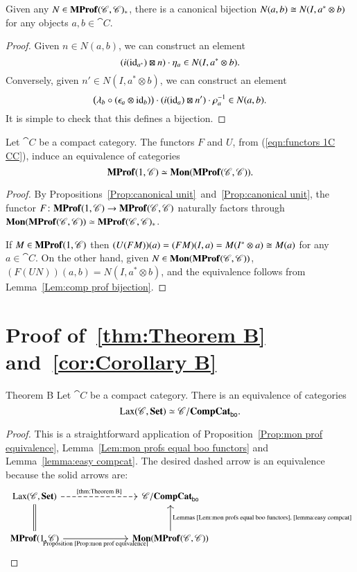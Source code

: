 \documentclass[12pt,oneside,article,draft]{memoir}
\begin{document}
\begin{lemma}\label{Lem:comp prof bijection}
	Given any $N\in\mathbf{MProf}(\mathscr{C},\mathscr{C})_*$, there is a canonical bijection $N(a,b)\cong N(I,a^*\otimes b)$ for any objects $a,b\in\cat{C}$.
\end{lemma}
\begin{proof}
	Given $n\in N(a,b)$, we can construct an element
	\[
		(i(\operatorname{id}_{a^*})\boxtimes n)\cdot\eta_a \in N(I,a^*\otimes b).
	\]
	Conversely, given $n'\in N(I,a^*\otimes b)$, we can construct an element 
	\[
		\bigl(\lambda_b\circ(\epsilon_a\otimes\operatorname{id}_b)\bigr)\cdot(i(\operatorname{id}_a)\boxtimes n')\cdot\rho_a^{-1} \in N(a,b).
	\]
	It is simple to check that this defines a bijection.
\end{proof}

\begin{proposition}\label{Prop:mon prof equivalence}
	Let $\cat{C}$ be a compact category.
	The functors $F$ and $U$, from (\ref{eqn:functors 1C CC}), induce an equivalence of categories 
	\[
		\mathbf{MProf}(1,\mathscr{C})\simeq\mathbf{Mon}(\mathbf{MProf}(\mathscr{C},\mathscr{C})).
	\]
\end{proposition}
\begin{proof}
	By Propositions~\ref{Prop:canonical unit}~and~\ref{Prop:canonical unit}, the functor $F\colon\mathbf{MProf}(1,\mathscr{C}) \to \mathbf{MProf}(\mathscr{C},\mathscr{C})$ naturally factors through $\mathbf{Mon}(\mathbf{MProf}(\mathscr{C},\mathscr{C}))\simeq\mathbf{MProf}(\mathscr{C},\mathscr{C})_*$. 

	If $M\in\mathbf{MProf}(1,\mathscr{C})$ then $(U(FM))(a)=(FM)(I,a)=M(I^*\otimes a)\cong M(a)$ for any $a\in\cat{C}$.
	On the other hand, given $N\in\mathbf{Mon}(\mathbf{MProf}(\mathscr{C},\mathscr{C}))$, $(F(UN))(a,b)=N(I,a^*\otimes b)$, and the equivalence follows from Lemma~\ref{Lem:comp prof bijection}.
\end{proof}

\section{Proof of~\ref{thm:Theorem B} and~\ref{cor:Corollary B}}\label{sec:proof of Bs}

\begin{named}{Theorem B}\label{thm:Theorem B}
	Let $\cat{C}$ be a compact category.
	There is an equivalence of categories
	\[
		\operatorname{Lax}(\mathscr{C},\mathbf{Set})\simeq\mathscr{C}/\mathbf{CompCat}_{\mathsf{bo}}.
	\]
\end{named}
\begin{proof}
	This is a straightforward application of Proposition~\ref{Prop:mon prof equivalence}, Lemma~\ref{Lem:mon profs equal boo functors} and Lemma~\ref{lemma:easy compcat}.
	The desired dashed arrow is an equivalence because the solid arrows are:
	$$
	\begin{tikzcd}[column sep=2.5cm,row sep=1cm]
		\Lax(\cat{C},\Set)\ar[d,equal]\ar[r,dashed,"\tn{\ref{thm:Theorem B}}"]
			&\cat{C}/\CompCat_{\bo} \\
		\MProf(1,\cat{C})\ar[r,"\tn{Proposition~\ref{Prop:mon prof equivalence}}"']
			&\Mon(\MProf(\cat{C},\cat{C}))\ar[u,"\tn{Lemmas~\ref{Lem:mon profs equal boo functors},~\ref{lemma:easy compcat}}"']
	\end{tikzcd}
	$$
\end{proof} 
\end{document}
